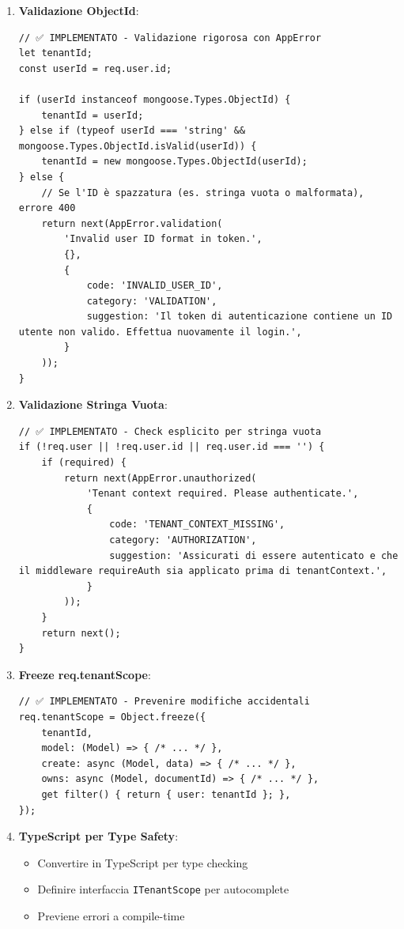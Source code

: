 \documentclass[11pt,a4paper]{article}
\begin{document}
\begin{enumerate}
    \item \textbf{Validazione ObjectId}:
    \begin{lstlisting}
// ✅ IMPLEMENTATO - Validazione rigorosa con AppError
let tenantId;
const userId = req.user.id;

if (userId instanceof mongoose.Types.ObjectId) {
    tenantId = userId;
} else if (typeof userId === 'string' && mongoose.Types.ObjectId.isValid(userId)) {
    tenantId = new mongoose.Types.ObjectId(userId);
} else {
    // Se l'ID è spazzatura (es. stringa vuota o malformata), errore 400
    return next(AppError.validation(
        'Invalid user ID format in token.',
        {},
        {
            code: 'INVALID_USER_ID',
            category: 'VALIDATION',
            suggestion: 'Il token di autenticazione contiene un ID utente non valido. Effettua nuovamente il login.',
        }
    ));
}
    \end{lstlisting}
    
    \item \textbf{Validazione Stringa Vuota}:
    \begin{lstlisting}
// ✅ IMPLEMENTATO - Check esplicito per stringa vuota
if (!req.user || !req.user.id || req.user.id === '') {
    if (required) {
        return next(AppError.unauthorized(
            'Tenant context required. Please authenticate.',
            {
                code: 'TENANT_CONTEXT_MISSING',
                category: 'AUTHORIZATION',
                suggestion: 'Assicurati di essere autenticato e che il middleware requireAuth sia applicato prima di tenantContext.',
            }
        ));
    }
    return next();
}
    \end{lstlisting}
    
    \item \textbf{Freeze req.tenantScope}:
    \begin{lstlisting}
// ✅ IMPLEMENTATO - Prevenire modifiche accidentali
req.tenantScope = Object.freeze({
    tenantId,
    model: (Model) => { /* ... */ },
    create: async (Model, data) => { /* ... */ },
    owns: async (Model, documentId) => { /* ... */ },
    get filter() { return { user: tenantId }; },
});
    \end{lstlisting}
    
    \item \textbf{TypeScript per Type Safety}:
    \begin{itemize}
        \item Convertire in TypeScript per type checking
        \item Definire interfaccia \texttt{ITenantScope} per autocomplete
        \item Previene errori a compile-time
    \end{itemize}
    

\end{enumerate}
\end{document}
